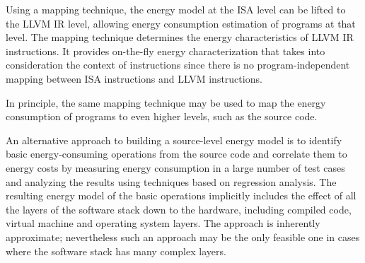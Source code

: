 Using a mapping technique, 
the energy model at the ISA level can be lifted to the LLVM IR level, allowing energy
consumption estimation of programs at that level. 
The mapping technique determines the energy characteristics of LLVM IR
instructions. It provides on-the-fly energy characterization that takes into
consideration the context of instructions since there is no program-independent mapping between
ISA instructions and LLVM instructions.

In principle, the same mapping technique may be used to map the energy consumption
of programs to even higher levels, such as the source code. 


An alternative approach to building a source-level energy model is to identify
basic energy-consuming operations from the source code and
correlate them to energy costs by measuring energy consumption in
a large number of test cases and analyzing the results using techniques
based on regression analysis. The resulting energy model of the basic
operations implicitly includes the effect of all the layers of the software
stack down to the hardware, including compiled code, virtual machine and operating
system layers. The approach is inherently approximate;
nevertheless such an approach may be the only feasible one in cases where the software
stack has many complex layers. 



